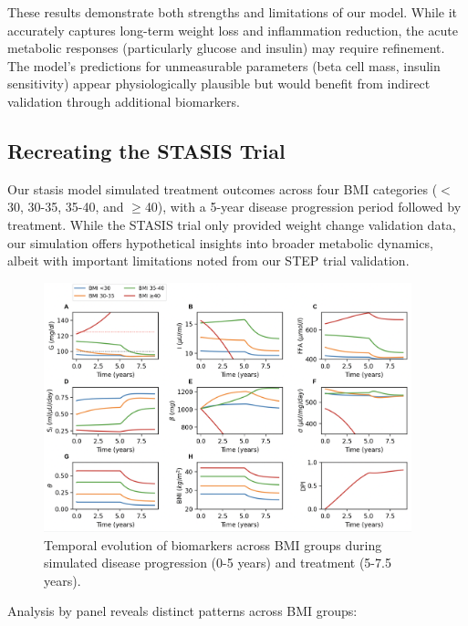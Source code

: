 These results demonstrate both strengths and limitations of our model. While it accurately captures long-term weight loss and inflammation reduction, the acute metabolic responses (particularly glucose and insulin) may require refinement. The model's predictions for unmeasurable parameters (beta cell mass, insulin sensitivity) appear physiologically plausible but would benefit from indirect validation through additional biomarkers.

\subsection{Recreating the STASIS Trial}
Our stasis model simulated treatment outcomes across four BMI categories ($<$30, 30-35, 35-40, and $\geq$40), with a 5-year disease progression period followed by treatment. While the STASIS trial only provided weight change validation data, our simulation offers hypothetical insights into broader metabolic dynamics, albeit with important limitations noted from our STEP trial validation.

\begin{figure}[!h]
\centering
\includegraphics[width=0.95\textwidth]{images/stasis_trial_simulations.png}
\caption{Temporal evolution of biomarkers across BMI groups during simulated disease progression (0-5 years) and treatment (5-7.5 years).}
\label{fig:stasis_trial}
\end{figure}

Analysis by panel reveals distinct patterns across BMI groups:

